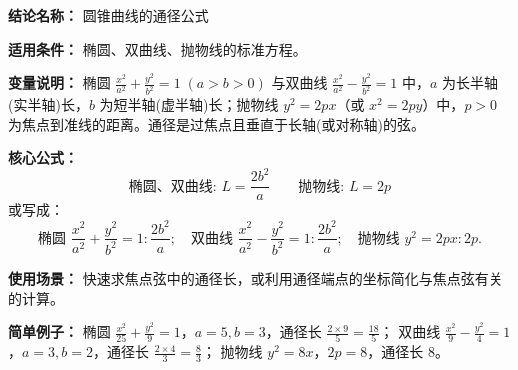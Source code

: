 \textbf{结论名称：} 圆锥曲线的通径公式

\textbf{适用条件：} 椭圆、双曲线、抛物线的标准方程。

\textbf{变量说明：} 椭圆 \(\frac{x^2}{a^2}+\frac{y^2}{b^2}=1\;(a>b>0)\) 与双曲线 \(\frac{x^2}{a^2}-\frac{y^2}{b^2}=1\) 中，\(a\) 为长半轴(实半轴)长，\(b\) 为短半轴(虚半轴)长；抛物线 \(y^2=2px\)（或 \(x^2=2py\)）中，\(p>0\) 为焦点到准线的距离。通径是过焦点且垂直于长轴(或对称轴)的弦。

\textbf{核心公式：}
\[
\text{椭圆、双曲线: } \boxed{L=\frac{2b^2}{a}}\qquad
\text{抛物线: } \boxed{L=2p}
\]
或写成：
\[
\text{椭圆 }\frac{x^2}{a^2}+\frac{y^2}{b^2}=1:\boxed{\frac{2b^2}{a}};\quad
\text{双曲线 }\frac{x^2}{a^2}-\frac{y^2}{b^2}=1:\boxed{\frac{2b^2}{a}};\quad
\text{抛物线 }y^2=2px:\boxed{2p}.
\]

\textbf{使用场景：} 快速求焦点弦中的通径长，或利用通径端点的坐标简化与焦点弦有关的计算。

\textbf{简单例子：}
椭圆 \(\frac{x^2}{25}+\frac{y^2}{9}=1\)，\(a=5,b=3\)，通径长 \(\frac{2\times 9}{5}=\frac{18}{5}\)；
双曲线 \(\frac{x^2}{9}-\frac{y^2}{4}=1\)，\(a=3,b=2\)，通径长 \(\frac{2\times 4}{3}=\frac{8}{3}\)；
抛物线 \(y^2=8x\)，\(2p=8\)，通径长 \(8\)。
